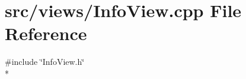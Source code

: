 \section{src/views/\-Info\-View.cpp File Reference}
\label{_info_view_8cpp}
{\ttfamily \#include \char`\"{}Info\-View.\-h\char`\"{}}\\*
